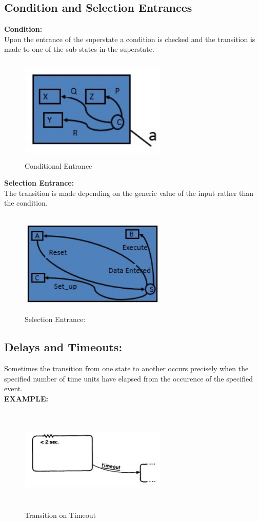 \documentclass[a4paper,12pt,oneside]{article}
\begin{document}
\subsection{Condition and Selection Entrances}
\textbf{Condition:}\\
Upon the entrance of the superstate a condition is checked and the transition is made to one of the sub-states in the superstate.\\ 
\begin{figure}[H]
\centering
\includegraphics[width=7cm,height=5cm]{Screenshot004.jpg}
\caption{Conditional Entrance}
\end{figure}
\noindent
\textbf{Selection Entrance:}\\
The transition is made depending on the generic value of the input rather than the condition.
\begin{figure}[H]
\centering
\includegraphics[width=7cm,height=5cm]{Screenshot005.jpg}
\caption{Selection Entrance:}
\end{figure}
\newpage
\subsection{Delays and Timeouts:}
Sometimes the transition from one state to another occurs precisely when the specified number of time units have elapsed from the occurence of the specified event.\\
\noindent
\textbf{EXAMPLE:}\\

\begin{figure}[H]
\centering
\includegraphics[width=7cm,height=5cm]{timeout.jpg}
\caption{Transition on Timeout}
\end{figure}
\end{document}
